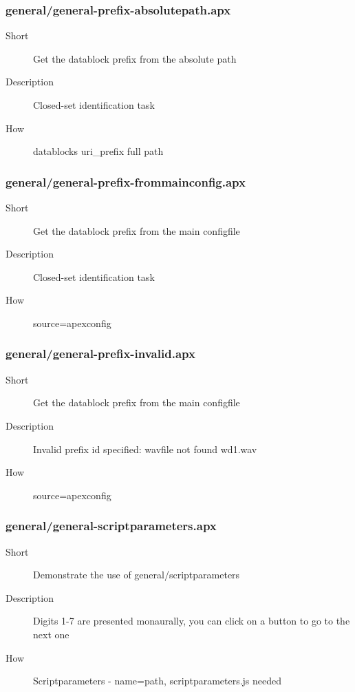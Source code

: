 \subsubsection{general/general-prefix-absolutepath.apx}
\begin{description}
\item[Short] 
 Get the datablock prefix from the absolute path
\item[Description] 
 Closed-set identification task
\item[How] 
 datablocks uri\_prefix full path
\end{description}

\subsubsection{general/general-prefix-frommainconfig.apx}
\begin{description}
\item[Short] 
   Get the datablock prefix from the main configfile
\item[Description] 
 Closed-set identification task
\item[How] 
 source=apexconfig
\end{description}

\subsubsection{general/general-prefix-invalid.apx}
\begin{description}
\item[Short] 
 Get the datablock prefix from the main configfile
\item[Description] 
 Invalid prefix id specified: wavfile not found wd1.wav
\item[How] 
 source=apexconfig
\end{description}

\subsubsection{general/general-scriptparameters.apx}
\begin{description}
\item[Short] 
 Demonstrate the use of general/scriptparameters
\item[Description] 
 Digits 1-7 are presented monaurally, you can click on a button to go to the next one
\item[How] 
 Scriptparameters - name=path, scriptparameters.js needed
\end{description}

